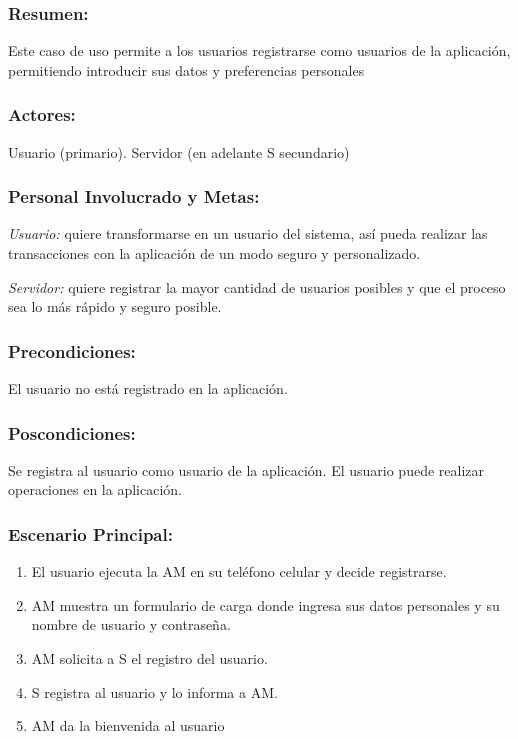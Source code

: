 \begin{framed}


\subsubsection{Resumen:} Este caso de uso permite a los usuarios registrarse como usuarios de la aplicación, permitiendo introducir sus datos y preferencias personales


\subsubsection{Actores:} Usuario (primario). Servidor (en adelante S secundario)

\subsubsection{Personal Involucrado y Metas:}

\emph{Usuario:} quiere transformarse en un usuario del sistema, así pueda realizar las transacciones con la aplicación de un modo seguro y personalizado.

\emph{Servidor:} quiere registrar la mayor cantidad de usuarios posibles y que el proceso sea lo más rápido y seguro posible. 

\subsubsection{Precondiciones:} 
El usuario no está registrado en la aplicación. 

\subsubsection{Poscondiciones:} 
Se registra al usuario como usuario de la aplicación. El usuario puede realizar operaciones en la aplicación.

\subsubsection{Escenario Principal: }

\begin{enumerate}
    \item El usuario ejecuta la AM en su teléfono celular y decide registrarse. 
    \item AM muestra un formulario de carga donde ingresa sus datos personales y su nombre de usuario y contraseña.
    \item AM solicita a S el registro del usuario. 
    \item S registra al usuario y lo informa a AM. 
    \item AM da la bienvenida al usuario
   

\end{enumerate}
\end{framed}

